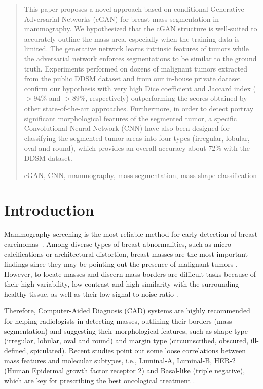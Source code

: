 \documentclass[runningheads,a4paper]{llncs}
\newcommand{\keywords}[1]{\par\addvspace\baselineskip
\noindent\keywordname\enspace\ignorespaces#1}
\begin{document}
\begin{abstract}
This paper proposes a novel approach based on conditional Generative Adversarial Networks (cGAN) for breast mass segmentation in mammography. We hypothesized that the cGAN structure is well-suited to accurately outline the mass area, especially when the training data is limited. The generative network learns intrinsic features of tumors while the adversarial network enforces segmentations to be similar to the ground truth. Experiments performed on dozens of malignant tumors extracted from the public DDSM dataset and from our in-house private dataset confirm our hypothesis with very high Dice coefficient and Jaccard index ($>94\%$ and $>89\%$, respectively) outperforming the scores obtained by other state-of-the-art approaches. Furthermore, in order to detect  portray significant morphological features of the segmented tumor, a specific Convolutional Neural Network (CNN) have also been designed for classifying the segmented tumor areas into four types (irregular, lobular, oval and round), which provides an overall accuracy about 72\% with the DDSM dataset.
\keywords{cGAN, CNN, mammography, mass segmentation, mass shape classification}
\end{abstract}


\section{Introduction}

Mammography screening is the most reliable method for early detection of breast carcinomas~\cite{ChengSMHCD06}. Among diverse types of breast abnormalities, such as micro-calcifications or architectural distortion, breast masses are the most important findings since they may be pointing out the presence of malignant tumors \cite{kopans1998}. However, to locate masses and discern mass borders are difficult tasks because of their high variability, low contrast and high similarity with the surrounding healthy tissue, as well as their low signal-to-noise ratio \cite{elmore2009}.

Therefore, Computer-Aided Diagnosis (CAD) systems are highly recommended for helping radiologists in detecting masses, outlining their borders (mass segmentation) and suggesting their morphological features, such as shape type (irregular, lobular, oval and round) and margin type (circumscribed, obscured, ill-defined, spiculated).
Recent studies point out some loose correlations between mass features and molecular subtypes, i.e., Luminal-A, Luminal-B, HER-2 (Human Epidermal growth factor receptor 2) and Basal-like (triple negative), which are key for prescribing the best oncological treatment \cite{cho2016,liu2016,tamaki2011}.
\end{document}
